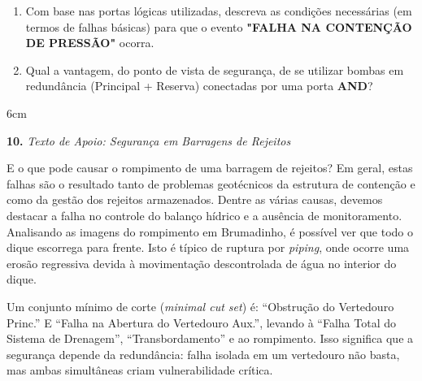 \documentclass[12pt]{article}
\begin{document}
\begin{enumerate}[label=\alph*)]
  \item Com base nas portas lógicas utilizadas, descreva as condições necessárias (em termos de falhas básicas) para que o evento \textbf{"FALHA NA CONTENÇÃO DE PRESSÃO"} ocorra.
  \item Qual a vantagem, do ponto de vista de segurança, de se utilizar bombas em redundância (Principal + Reserva) conectadas por uma porta \textbf{AND}?
\end{enumerate}
\begin{resposta}{6cm}
\end{resposta}

\vspace{0.5cm}

\textbf{10.} \textit{Texto de Apoio: Seguran\c{c}a em Barragens de Rejeitos}

E o que pode causar o rompimento de uma barragem de rejeitos? Em geral, estas falhas s\~ao o resultado tanto de problemas geot\'ecnicos da estrutura de conten\c{c}\~ao e como da gest\~ao dos rejeitos armazenados. Dentre as v\'arias causas, devemos destacar a falha no controle do balan\c{c}o h\'idrico e a aus\^encia de monitoramento. Analisando as imagens do rompimento em Brumadinho, \'e poss\'ivel ver que todo o dique escorrega para frente. Isto \'e t\'ipico de ruptura por \textit{piping}, onde ocorre uma eros\~ao regressiva devida \`a movimenta\c{c}\~ao descontrolada de \'agua no interior do dique. 

Um conjunto m\'inimo de corte (\textit{minimal cut set}) \'e: ``Obstru\c{c}\~ao do Vertedouro Princ.'' E ``Falha na Abertura do Vertedouro Aux.'', levando \`a ``Falha Total do Sistema de Drenagem'', ``Transbordamento'' e ao rompimento. Isso significa que a seguran\c{c}a depende da redund\^ancia: falha isolada em um vertedouro n\~ao basta, mas ambas simult\^aneas criam vulnerabilidade cr\'itica.

\small{}
\end{document}
